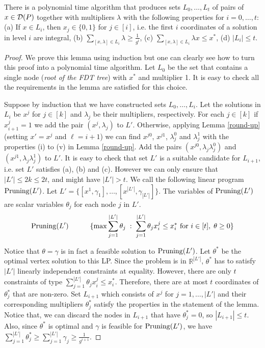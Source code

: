 \begin{lemma}\label{prune}
	There is a polynomial time algorithm that produces sets $L_0,\ldots,L_t$ of pairs of $x\in \operatorname{\mathcal{D}}(P)$ together with multipliers $\lambda$ with the following properties for $i=0,\ldots,t$:
	(a) If $x\in L_i$, then $x_j \in \{0,1\}$ for $j\in [i]$, i.e. the first $i$ coordinates of a solution in level $i$ are integral, (b) $\sum_{[x,\lambda]\in L_i} \lambda\geq\frac{1}{g^i}$, (c) $\sum_{[x,\lambda]\in L_i}\lambda x \leq x^*$, (d) $|L_i|\leq t$.
\end{lemma}
\begin{proof}
	We prove this lemma using induction but one can clearly see how to turn this proof into a polynomial time algorithm. Let $L_0$ be the set that contains a single node (\textit{root of the FDT tree}) with $x^*$ and multiplier 1. It is easy to check all the requirements in the lemma are satisfied for this choice.
	
	Suppose by induction that we have constructed sets $L_0,\ldots,L_i$. Let the solutions in $L_i$ be $x^j$ for $j\in [k]$ and $\lambda_j$ be their multipliers, respectively. For each $j\in[k]$ if $x^j_{i+1}=1$ we add the pair $(x^j,\lambda_j)$ to $L'$. Otherwise,	applying Lemma \ref{round-up} (setting $x'= x^j$ and $\ell = i+1$) we can find $x^{j0}$, $x^{j1}$, $\lambda^0_j$ and $\lambda^1_j$ with the properties (i) to (v) in Lemma \ref{round-up}. Add the pairs  $(x^{j0} ,\lambda_j\lambda^0_j)$ and  $(x^{j1} ,\lambda_j\lambda^1_j)$ to $L'$. It is easy to check that set $L'$ is a suitable candidate for $L_{i+1}$, i.e. set $L'$ satisfies (a), (b) and (c). However we can only ensure that $|L'|\leq 2k\leq 2t$, and might have $|L'|>t$. We call the following linear program $\operatorname{{{Pruning}}}(L')$. Let $L' = \{[x^1,\gamma_1],\ldots,[x^{|L'|},\gamma_{|L'|}]\}$. The variables of $\operatorname{{{Pruning}}}(L')$ are scalar variables $\theta_j$ for each node $j$ in $L'$.  
		\begin{equation}
		\operatorname{{{Pruning}}}(L')\quad\quad\quad \{\max \sum_{j=1}^{|L'|} \theta_j\;:\; \sum_{j=1}^{|L'|} \theta_j x^j_i\leq x^*_i \mbox{ for $i\in [t]$},\; \theta\geq 0 \}
		\end{equation}
		
		Notice that $\theta = \gamma$ is in fact a feasible solution to $\operatorname{{{Pruning}}}(L')$. Let $\theta^*$ be the optimal vertex solution to this LP. Since the problem is in $\mathbb{R}^{|L'|}$,  $\theta^*$ has to satisfy $|L'|$ linearly independent constraints at equality. However, there are only $t$ constraints of type $ \sum_{j=1}^{|L'|} \theta_j x^j_i\leq x^*_i$. Therefore, there are at most $t$ coordinates of $\theta^*_j$ that are non-zero. Set $L_{i+1}$ which consists of $x^j$ for $j=1,\ldots,|L'|$ and their corresponding multipliers $\theta^*_j$ satisfy the properties in the statement of the lemma. Notice that, we can discard the nodes in $L_{i+1}$ that have $\theta^*_j=0$, so $|L_{i+1}| \leq t$. Also, since $\theta^*$ is optimal and $\gamma$ is feasible for $\operatorname{{{Pruning}}}(L')$, we have $\sum_{j=1}^{|L'|} \theta^*_j \geq \sum_{j=1}^{|L'|}\gamma_j \geq \frac{1}{g^{i+1}}$. \end{proof}
	
